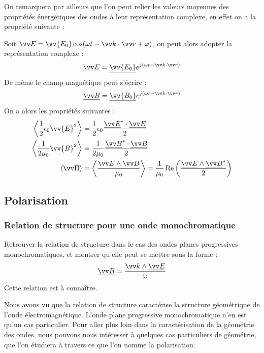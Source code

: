 \documentclass[11pt,fleqn]{book} %
\begin{document}
On remarquera par ailleurs que l'on peut relier les valeurs moyennes des propriétés énergétiques des ondes à leur représentation complexe, en effet on a la propriété suivante :
\begin{proposition}
	Soit $\vv E = \vv{E_0} \cos(\omega t - \vv k \cdot \vv r + \varphi)$, on peut alors adopter la représentation complexe :
	\begin{equation}
		\underline{\vv E} = \underline{\vv{E_0}} e^{j(\omega t - \vv k \cdot \vv r)}
	\end{equation}
	De même le champ magnétique peut s'écrire :
	\begin{equation}
		\underline{\vv B} = \underline{\vv{B_0}} e^{j(\omega t - \vv k \cdot \vv r)}
	\end{equation}
	On a alors les propriétés suivantes :
	\begin{align}
		\left\langle \frac{1}{2} \epsilon_0 \vv{E}^2 \right\rangle &= \frac{1}{2} \epsilon_0 \frac{ \underline{\vv E}^\ast \cdot \underline{\vv E}}{2} \\
		\left\langle \frac{1}{2 \mu_0} \vv{B}^2 \right\rangle &= \frac{1}{2 \mu_0} \frac{ \underline{\vv B}^\ast \cdot \underline{\vv B}}{2} \\
		\langle \vv \Pi \rangle &= \left\langle \frac{\vv E \wedge \vv B}{\mu_0} \right\rangle = \frac{1}{\mu_0} \Re \left( \frac{\underline{\vv E} \wedge \underline{\vv B}^\ast}{2} \right)
	\end{align}
\end{proposition}


\subsection{Polarisation}

\subsubsection{Relation de structure pour une onde monochromatique}

\begin{capex}
	Retrouver la relation de structure dans le cas des ondes planes progressives monochromatiques, et montrer qu'elle peut se mettre sous la forme :
	\begin{equation}
		\underline{\vv B} = \frac{\vv k \wedge \underline{\vv E}}{\omega}
	\end{equation}
	Cette relation est à connaître.
\end{capex}

Nous avons vu que la relation de structure caractérise la structure géométrique de l'onde électromagnétique. L'onde plane progressive monochromatique n'en est qu'un cas particulier. Pour aller plus loin dans la caractérisation de la géométrie des ondes, nous pouvons nous intéresser à quelques cas particuliers de géométrie, que l'on étudiera à travers ce que l'on nomme la polarisation.
\end{document}
